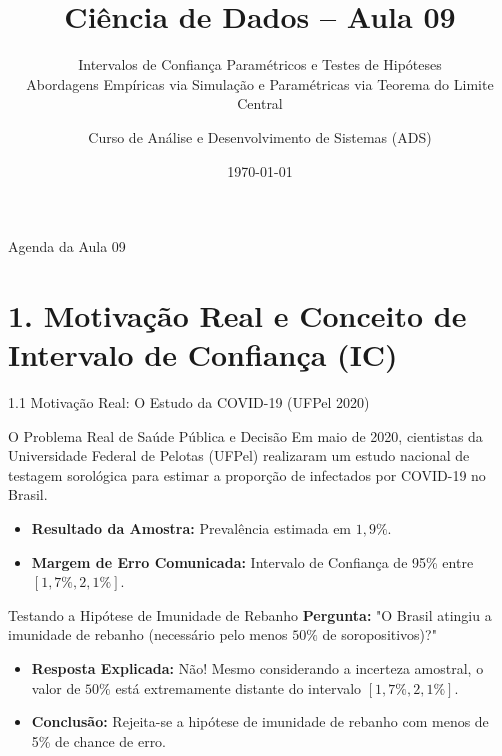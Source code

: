 \documentclass[10pt, aspectratio=169]{beamer}
\title[Ciência de Dados: ICs e Hipóteses]{Ciência de Dados -- Aula 09}
\subtitle{Intervalos de Confiança Paramétricos e Testes de Hipóteses\\{\small Abordagens Empíricas via Simulação e Paramétricas via Teorema do Limite Central}}
\author[ADS]{Curso de Análise e Desenvolvimento de Sistemas (ADS)}
\institute[ADS]{Disciplina: Ciência de Dados}
\date{\today}
\begin{document}
\begin{frame}
    \titlepage
\end{frame}

\begin{frame}{Agenda da Aula 09}
    \tableofcontents
\end{frame}

\section{1. Motivação Real e Conceito de Intervalo de Confiança (IC)}

\begin{frame}{1.1 Motivação Real: O Estudo da COVID-19 (UFPel 2020)}
    \begin{block}{O Problema Real de Saúde Pública e Decisão}
        Em maio de 2020, cientistas da Universidade Federal de Pelotas (UFPel) realizaram um estudo nacional de testagem sorológica para estimar a proporção de infectados por COVID-19 no Brasil.
        \begin{itemize}
            \item \textbf{Resultado da Amostra:} Prevalência estimada em \textbf{$1{,}9\%$}.
            \item \textbf{Margem de Erro Comunicada:} Intervalo de Confiança de 95\% entre \textbf{$[1{,}7\%, 2{,}1\%]$}.
        \end{itemize}
    \end{block}

    \vspace{0.2cm}

    \begin{alertblock}{Testando a Hipótese de Imunidade de Rebanho}
        \textbf{Pergunta:} "O Brasil atingiu a imunidade de rebanho (necessário pelo menos $50\%$ de soropositivos)?"
        \begin{itemize}
            \item \textbf{Resposta Explicada:} Não! Mesmo considerando a incerteza amostral, o valor de $50\%$ está extremamente distante do intervalo $[1{,}7\%, 2{,}1\%]$.
            \item \textbf{Conclusão:} Rejeita-se a hipótese de imunidade de rebanho com menos de 5\% de chance de erro.
        \end{itemize}
    \end{alertblock}
\end{frame}
\end{document}
